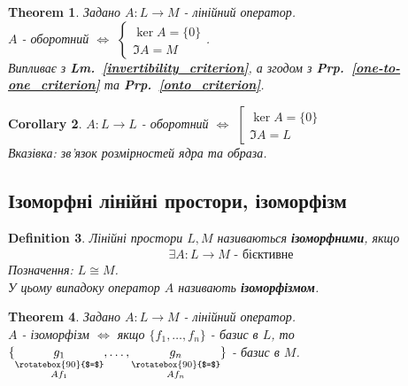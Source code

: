 \documentclass[a4paper, 10pt]{article}
\theoremstyle{theoremdd}
\newtheorem{theorem}{Theorem}[subsection]
\newtheorem{definition}[theorem]{Definition}
\newtheorem{corollary}[theorem]{Corollary}
\newcommand\prpref[1]{\textbf{Prp.~\ref{#1}}}
\newcommand\lmref[1]{\textbf{Lm.~\ref{#1}}}
\begin{document}
	\begin{theorem}
	Задано $A \colon L \to M$ - лінійний оператор.\\
	$A$ - оборотний $\iff$ $\begin{cases} \ker A = \{0\} \\ \Im A = M \end{cases}$.\\
	\textit{Випливає з \lmref{invertibility_criterion}, а згодом з \prpref{one-to-one_criterion} та \prpref{onto_criterion}.}
	\end{theorem}
	
	\begin{corollary}
	$A \colon L \to L$ - оборотний $\iff$ $\left[ \begin{gathered} \ker A = \{0\} \\ \Im A = L \end{gathered} \right.$\\
	\textit{Вказівка: зв'язок розмірностей ядра та образа}.
	\end{corollary}
	
	\subsection{Ізоморфні лінійні простори, ізоморфізм}
	\begin{definition}
	Лінійні простори $L,M$ називаються \textbf{ізоморфними}, якщо
	\begin{align*}
	\exists A \colon L \to M \text{ - бієктивне}
	\end{align*}
	Позначення: $L \cong M$.\\
	У цьому випадоку оператор $A$ називають \textbf{ізоморфізмом}.
	\end{definition}
	
	\begin{theorem}
	Задано $A \colon L \to M$ - лінійний оператор.\\
	$A$ - ізоморфізм $\iff$ якщо $\{f_1,\dots,f_n\}$ - базис в $L$, то $\{\underset{\substack{\rotatebox{90}{$=$} \\ Af_1}}{g_1},\dots, \underset{\substack{\rotatebox{90}{$=$} \\ Af_n}}{g_n}\}$ - базис в $M$.
	\end{theorem}
	
\end{document}
